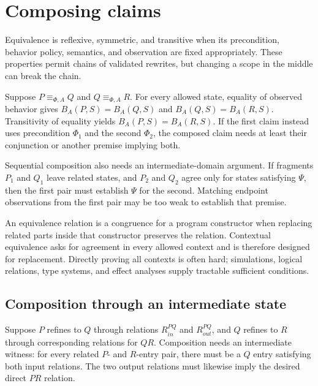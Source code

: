 \section{Composing claims}

Equivalence is reflexive, symmetric, and transitive when its precondition,
behavior policy, semantics, and observation are fixed appropriately. These
properties permit chains of validated rewrites, but changing a scope in the
middle can break the chain.

Suppose \(P\equiv_{\Phi,A}Q\) and \(Q\equiv_{\Phi,A}R\). For every allowed
state, equality of observed behavior gives \(B_A(P,S)=B_A(Q,S)\) and
\(B_A(Q,S)=B_A(R,S)\). Transitivity of equality yields
\(B_A(P,S)=B_A(R,S)\). If the first claim instead uses precondition \(\Phi_1\)
and the second \(\Phi_2\), the composed claim needs at least their conjunction
or another premise implying both.

Sequential composition also needs an intermediate-domain argument. If
fragments \(P_1\) and \(Q_1\) leave related states, and \(P_2\) and \(Q_2\)
agree only for states satisfying \(\Psi\), then the first pair must establish
\(\Psi\) for the second. Matching endpoint observations from the first pair
may be too weak to establish that premise.

\begin{goingdeeper}[title={Congruence is equivalence that survives construction}]
An equivalence relation is a congruence for a program constructor when
replacing related parts inside that constructor preserves the relation.
Contextual equivalence asks for agreement in every allowed context and is
therefore designed for replacement. Directly proving all contexts is often
hard; simulations, logical relations, type systems, and effect analyses supply
tractable sufficient conditions.
\end{goingdeeper}

\subsection{Composition through an intermediate state}

Suppose \(P\) refines to \(Q\) through relations \(R_{in}^{PQ}\) and
\(R_{out}^{PQ}\), and \(Q\) refines to \(R\) through corresponding relations
for \(QR\). Composition needs an intermediate witness: for every related
\(P\)- and \(R\)-entry pair, there must be a \(Q\) entry satisfying both input
relations. The two output relations must likewise imply the desired direct
\(PR\) relation.

